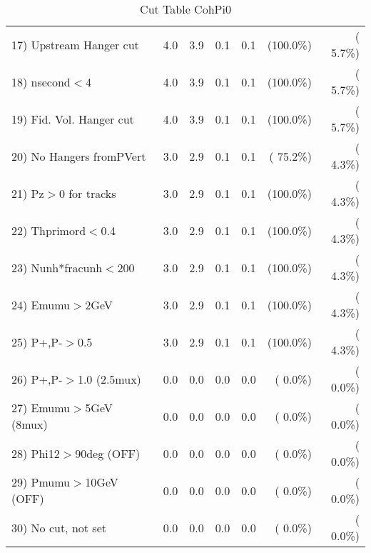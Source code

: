 \begin{table}[h!]
\begin{tabular}{||l||r|r|r|r|r|r||}
 17) Upstream Hanger cut  &          4.0 &          3.9 &          0.1 &          0.1 & (100.0\%) & (  5.7\%) \\
 18) nsecond$<$4          &          4.0 &          3.9 &          0.1 &          0.1 & (100.0\%) & (  5.7\%) \\
 19) Fid. Vol. Hanger cut &          4.0 &          3.9 &          0.1 &          0.1 & (100.0\%) & (  5.7\%) \\
 20) No Hangers fromPVert &          3.0 &          2.9 &          0.1 &          0.1 & ( 75.2\%) & (  4.3\%) \\
 21) Pz$>$0 for tracks    &          3.0 &          2.9 &          0.1 &          0.1 & (100.0\%) & (  4.3\%) \\
 22) Thprimord$<$0.4      &          3.0 &          2.9 &          0.1 &          0.1 & (100.0\%) & (  4.3\%) \\
 23) Nunh*fracunh$<$200   &          3.0 &          2.9 &          0.1 &          0.1 & (100.0\%) & (  4.3\%) \\
 24) Emumu$>$2GeV         &          3.0 &          2.9 &          0.1 &          0.1 & (100.0\%) & (  4.3\%) \\
 25) P+,P-$>$0.5          &          3.0 &          2.9 &          0.1 &          0.1 & (100.0\%) & (  4.3\%) \\
 26) P+,P-$>$1.0 (2.5mux) &          0.0 &          0.0 &          0.0 &          0.0 & (  0.0\%) & (  0.0\%) \\
 27) Emumu$>$5GeV  (8mux) &          0.0 &          0.0 &          0.0 &          0.0 & (  0.0\%) & (  0.0\%) \\
 28) Phi12$>$90deg  (OFF) &          0.0 &          0.0 &          0.0 &          0.0 & (  0.0\%) & (  0.0\%) \\
 29) Pmumu$>$10GeV  (OFF) &          0.0 &          0.0 &          0.0 &          0.0 & (  0.0\%) & (  0.0\%) \\
 30) No cut, not set      &          0.0 &          0.0 &          0.0 &          0.0 & (  0.0\%) & (  0.0\%) \\
 \hline
 \hline
 \end{tabular}
 \caption{Cut Table  CohPi0   }
 \label{tab-cutheavy_neutrino_0.500}
 \end{table}
